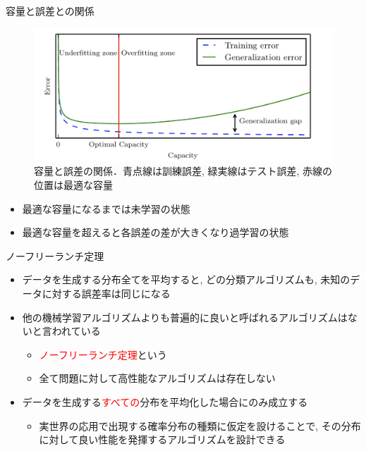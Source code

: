 \documentclass[dvipdfmx, 10pt]{beamer}
\newcommand{\green}[1]{\textcolor{green!40!black}{#1}}
\newcommand{\blue}[1]{\textcolor{blue!80!black}{#1}}
\begin{document}

\begin{frame}{容量と誤差との関係}
  \begin{figure}
     \includegraphics[width=0.8\linewidth]{./images/capacity.png}
     \caption{容量と誤差の関係．青点線は訓練誤差, 緑実線はテスト誤差, 赤線の位置は最適な容量}
  \end{figure}
  \begin{itemize}
    \item 最適な容量になるまでは未学習の状態
    \item 最適な容量を超えると各誤差の差が大きくなり過学習の状態
  \end{itemize}
\end{frame}


\begin{frame}{ノーフリーランチ定理}
  \begin{itemize}
    \item データを生成する分布全てを平均すると, どの分類アルゴリズムも, 未知のデータに対する誤差率は同じになる
    \item 他の機械学習アルゴリズムよりも普遍的に良いと呼ばれるアルゴリズムはないと言われている
    \begin{itemize}
      \item \textcolor{red}{ノーフリーランチ定理}という
	  \item \blue{全て問題に対して高性能なアルゴリズムは存在しない}
    \end{itemize}
    \item データを生成する\textcolor{red}{すべての}分布を平均化した場合にのみ成立する
    \begin{itemize}
      \item 実世界の応用で出現する確率分布の種類に仮定を設けることで, その分布に対して良い性能を発揮するアルゴリズムを設計できる
    \end{itemize}
  \end{itemize}
\end{frame}
\end{document}
